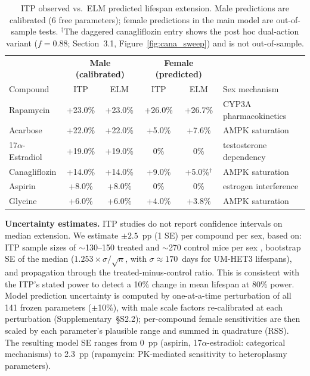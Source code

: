 \documentclass[11pt]{article}
\begin{document}
\begin{table}[ht]
\centering
\caption{ITP observed vs.\ ELM predicted lifespan extension. Male predictions are calibrated (6 free parameters); female predictions in the main model are out-of-sample tests. $^\dagger$The daggered canagliflozin entry shows the post hoc dual-action variant ($f = 0.88$; Section~3.1, Figure~\ref{fig:cana_sweep}) and is not out-of-sample.}
\label{tab:calibration}
\begin{tabular}{@{}l|cc|cc|l@{}}
\toprule
 & \multicolumn{2}{c|}{\textbf{Male (calibrated)}} & \multicolumn{2}{c|}{\textbf{Female (predicted)}} & \\
Compound & ITP & ELM & ITP & ELM & Sex mechanism \\
\midrule
Rapamycin      & +23.0\% & +23.0\% & +26.0\% & +26.7\% & CYP3A pharmacokinetics \\
Acarbose       & +22.0\% & +22.0\% & +5.0\%  & +7.6\%  & AMPK saturation \\
17$\alpha$-Estradiol & +19.0\% & +19.0\% & 0\%     & 0\%     & testosterone dependency \\
Canagliflozin  & +14.0\% & +14.0\% & +9.0\%  & +5.0\%$^\dagger$  & AMPK saturation \\
Aspirin        & +8.0\%  & +8.0\%  & 0\%     & 0\%     & estrogen interference \\
Glycine        & +6.0\%  & +6.0\%  & +4.0\%  & +3.8\%  & AMPK saturation \\
\bottomrule
\end{tabular}
\end{table}

\textbf{Uncertainty estimates.} ITP studies do not report confidence intervals on median extension. We estimate $\pm 2.5$~pp (1 SE) per compound per sex, based on: ITP sample sizes of $\sim$130--150 treated and $\sim$270 control mice per sex \citep{Miller2007}, bootstrap SE of the median ($1.253 \times \sigma / \sqrt{n}$, with $\sigma \approx 170$~days for UM-HET3 lifespans), and propagation through the treated-minus-control ratio. This is consistent with the ITP's stated power to detect a 10\% change in mean lifespan at 80\% power. Model prediction uncertainty is computed by one-at-a-time perturbation of all 141 frozen parameters ($\pm$10\%), with male scale factors re-calibrated at each perturbation (Supplementary~\S S2.2); per-compound female sensitivities are then scaled by each parameter's plausible range and summed in quadrature (RSS). The resulting model SE ranges from 0~pp (aspirin, 17$\alpha$-estradiol: categorical mechanisms) to 2.3~pp (rapamycin: PK-mediated sensitivity to heteroplasmy parameters).
\end{document}

